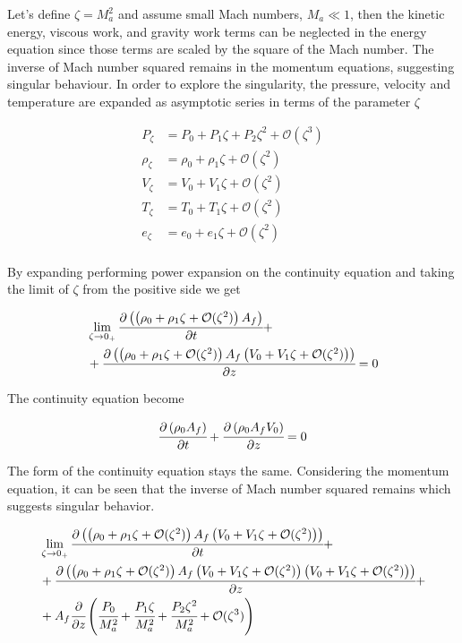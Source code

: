 \documentclass[../Article_Model_Parameters.tex]{subfiles}
\begin{document}
	Let's define $\zeta=M_a^2$ and assume small Mach numbers, $M_a \ll 1$, then the kinetic energy, viscous work, and gravity work terms can be neglected in the energy equation since those terms are scaled by the square of the Mach number. The inverse of Mach number squared remains in the momentum equations, suggesting singular behaviour. In order to explore the singularity, the pressure, velocity and temperature are expanded as asymptotic series in terms of the parameter $\zeta$
	
	{\footnotesize
		\begin{align*}
			P_\zeta 	& = P_0 	+ P_1 \zeta		+ P_2 \zeta^2 		+ \mathcal{O}(\zeta^3) \\
			\rho_\zeta 	& = \rho_0	+ \rho_1 \zeta	+ \mathcal{O}(\zeta^2) \\
			V_\zeta 	& = V_0		+ V_1 \zeta 	+ \mathcal{O}(\zeta^2) \\
			T_\zeta 	& = T_0 	+ T_1 \zeta 	+ \mathcal{O}(\zeta^2) \\
			e_\zeta 	& = e_0 	+ e_1 \zeta 	+ \mathcal{O}(\zeta^2) \\
		\end{align*}
	}

	 By expanding performing power expansion on the continuity equation and taking the limit of $\zeta$ from the positive side we get
	 
	 {\footnotesize
	 	\begin{align*}
	 		& \lim_{\zeta \rightarrow 0_+} \cfrac{\partial \left( \left( \rho_0	+ \rho_1 \zeta	+ \mathcal{O}(\zeta^2) \right) A_f \right)}{\partial t} + \\
	 		&+ \cfrac{\partial \left(  \left(  \rho_0 + \rho_1 \zeta + \mathcal{O}(\zeta^2) \right) A_f \left( V_0	+V_1 \zeta 	+ \mathcal{O}(\zeta^2) \right) \right) }{\partial z} = 0
	 	\end{align*}
	 }
 
	The continuity equation become
	
		 {\footnotesize
		\begin{equation}
			\cfrac{\partial \left( \rho_0 A_f \right)}{\partial t} + \cfrac{\partial \left( \rho_0 A_f V_0 \right)}{\partial z} = 0
		\end{equation}
	}

	The form of the continuity equation stays the same. Considering the momentum equation, it can be seen that the inverse of Mach number squared remains which suggests singular behavior. 
	
	{\footnotesize
		\begin{align*}
		 & \lim_{\zeta \rightarrow 0_+} \cfrac{\partial \left(  \left(  \rho_0 + \rho_1 \zeta + \mathcal{O}(\zeta^2) \right) A_f \left( V_0	+V_1 \zeta 	+ \mathcal{O}(\zeta^2) \right) \right) }{\partial t} + \\
		 &+ \cfrac{\partial \left(  \left(  \rho_0	+ \rho_1 \zeta	+ \mathcal{O}(\zeta^2) \right) A_f \left( V_0	+ V_1 \zeta 	+ \mathcal{O}(\zeta^2) \right) \left( V_0	+ V_1 \zeta + \mathcal{O}(\zeta^2) \right) \right) }{\partial z} + \\
		 &+ A_f \cfrac{\partial }{\partial z} \left(  \cfrac{P_0}{M_a^2}	+ \cfrac{P_1 \zeta}{M_a^2}	+ \cfrac{P_2 \zeta^2}{M_a^2} + \mathcal{O}(\zeta^3) \right)
		\end{align*}
	}
\end{document}
